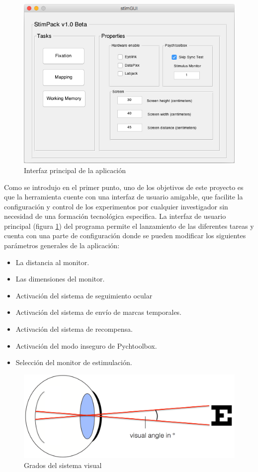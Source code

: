 \documentclass[conference]{IEEEtran}
\begin{document}
\begin{figure}[htbp]
\centerline{\includegraphics[width=\linewidth]{figures/main_gui}}
\caption{Interfaz principal de la aplicación}
\label{figmainGUI}
\end{figure}
Como se introdujo en el primer punto, uno de los objetivos de este proyecto es que la herramienta cuente con una interfaz de usuario amigable, que facilite la configuración y control de los experimentos por cualquier investigador sin necesidad de una formación tecnológica especifica.
La interfaz de usuario principal (figura \ref{figmainGUI}) del programa permite el lanzamiento de las diferentes tareas y cuenta con una parte de configuración donde se pueden modificar los siguientes parámetros generales de la aplicación:
\begin{itemize}
	\item La distancia al monitor.
	\item Las dimensiones del monitor.
	\item Activación del sistema de seguimiento ocular
	\item Activación del sistema de envío de marcas temporales.
	\item Activación del sistema de recompensa.
	\item Activación del modo inseguro de Pychtoolbox.
	\item Selección del monitor de estimulación.
\end{itemize} 

\begin{figure}[htbp]
\centerline{\includegraphics[width=\linewidth]{figures/visual_degrees}}
\caption{Grados del sistema visual}
\label{figvisualDegrees}
\end{figure}
\end{document}
